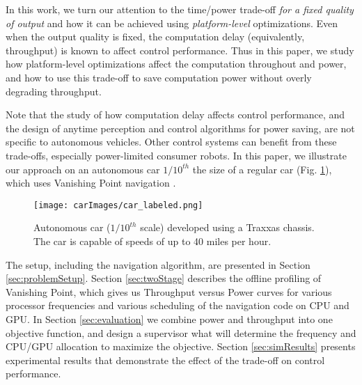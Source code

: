 In this work, we turn our attention to the time/power trade-off \emph{for a fixed quality of output} and how it can be achieved using \emph{platform-level} optimizations.
Even when the output quality is fixed, the computation delay (equivalently, throughput) is known to affect control performance. 
Thus in this paper, we study how platform-level optimizations affect the computation throughout and power, and how to use this trade-off to save computation power without overly degrading throughput.

Note that the study of how computation delay affects control performance, and the design of anytime perception and control algorithms for power saving, are not specific to autonomous vehicles.
Other control systems can benefit from these trade-offs, especially power-limited consumer robots.
In this paper, we illustrate our approach on an autonomous car $1/10^{th}$ the size of a regular car (Fig. \ref{fig:traxxas}), which uses Vanishing Point navigation \cite{VP1}.
\begin{figure}[t]
	\centering
	\texttt{[image: carImages/car\_labeled.png]}
	\caption{Autonomous car ($1/10^{th}$ scale) developed using a Traxxas chassis. The car is capable of speeds of up to 40 miles per hour.}
		\label{fig:traxxas}
\end{figure}  
The setup, including the navigation algorithm, are presented in Section \ref{sec:problemSetup}.
Section \ref{sec:twoStage} describes the offline profiling of Vanishing Point, which gives us Throughput versus Power curves for various processor frequencies and various scheduling of the navigation code on CPU and GPU.
In Section \ref{sec:evaluation} we combine power and throughput into one objective function, and design a supervisor what will determine the frequency and CPU/GPU allocation to maximize the objective.
Section \ref{sec:simResults} presents experimental results that demonstrate the effect of the trade-off on control performance.

